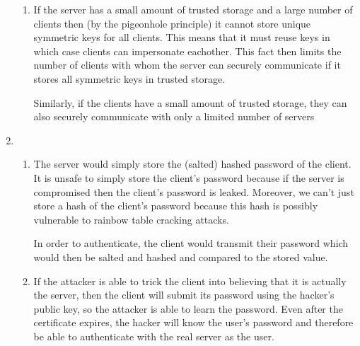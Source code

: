 \documentclass[12pt]{article}
\begin{document}
\begin{enumerate}
\begin{enumerate}
  \item 
    If the server has a small amount of trusted storage and a large number of clients then (by the pigeonhole principle) it cannot store unique symmetric keys for all clients. This means that it must reuse keys in which case clients can impersonate eachother. This fact then limits the number of clients with whom the server can securely communicate if it stores all symmetric keys in trusted storage.

    Similarly, if the clients have a small amount of trusted storage, they can also securely communicate with only a limited number of servers
    
  \end{enumerate}

\item 
  
  \begin{enumerate}
  \item 
    The server would simply store the (salted) hashed password of the client. It is unsafe to simply store the client's password because if the server is compromised then the client's password is leaked. Moreover, we can't just store a hash of the client's password because this hash is possibly vulnerable to rainbow table cracking attacks.
    
    In order to authenticate, the client would transmit their password which would then be salted and hashed and compared to the stored value.

  \item 
    If the attacker is able to trick the client into believing that it is actually the server, then the client will submit its password using the hacker's public key, so the attacker is able to learn the password. Even after the certificate expires, the hacker will know the user's password and therefore be able to authenticate with the real server as the user.
    
  \end{enumerate}

  
\end{enumerate}
\end{document}
